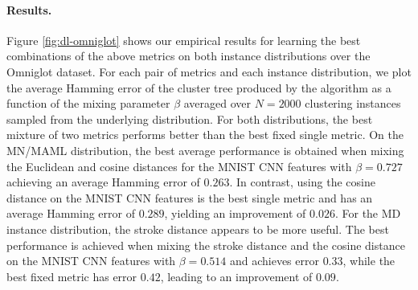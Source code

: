 \paragraph{Results.} Figure \ref{fig:dl-omniglot} shows our empirical results for
learning the best combinations of the above metrics on both instance
distributions over the Omniglot dataset. For each pair of metrics and each
instance distribution, we plot the average Hamming error of the cluster tree
produced by the algorithm as a function of the mixing parameter $\beta$ averaged
over $N = 2000$ clustering instances sampled from the underlying distribution.
For both distributions, the best mixture of two metrics performs better than the
best fixed single metric. On the MN/MAML distribution, the best average
performance is obtained when mixing the Euclidean and cosine distances for the
MNIST CNN features with $\beta = 0.727$ achieving an average Hamming error of
$0.263$. In contrast, using the cosine distance on the MNIST CNN features is the
best single metric and has an average Hamming error of $0.289$, yielding an
improvement of $0.026$. For the MD instance distribution, the stroke distance
appears to be more useful. The best performance is achieved when mixing the
stroke distance and the cosine distance on the MNIST CNN features with $\beta =
0.514$ and achieves error $0.33$, while the best fixed metric has error $0.42$,
leading to an improvement of $0.09$.


